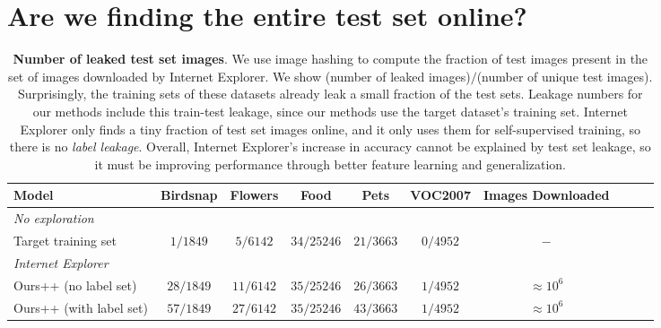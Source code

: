 \section{Are we finding the entire test set online?}
\label{sec:finding_test_set_online}
\begin{table}[t]
    \centering
    \begin{tabular}{lccccccccc}
    \toprule
        Model & Birdsnap & Flowers & Food  & Pets & VOC2007  & Images Downloaded \\
    \midrule
    \textit{No exploration} \\
        \;\;\; Target training set                          &  $1/1849$ &  $5/6142$ & $34/25246$ & $21/3663$ &  $0/4952$ & $-$ \\
    \midrule
    \textit{Internet Explorer} \\
        \;\;\;Ours++ (no label set)                         &  $28/1849$ & $11/6142$ & $35/25246$ & $26/3663$ & $1/4952$ & $\approx 10^6$\\
        \;\;\;Ours++ (with label set)                       & $57/1849$ & $27/6142$ & $35/25246$ & $43/3663$ & $1/4952$ & $\approx 10^6$ \\
    \bottomrule
    \end{tabular}
    \caption{\textbf{Number of leaked test set images}. We use image hashing to compute the fraction of test images present in the set of images downloaded by Internet Explorer.  We show (number of leaked images)$/$(number of unique test images). Surprisingly, the training sets of these datasets already leak a small fraction of the test sets. Leakage numbers for our methods include this train-test leakage, since our methods use the target dataset's training set. Internet Explorer only finds a tiny fraction of test set images online, and it only uses them for self-supervised training, so there is no \textit{label leakage}. Overall, Internet Explorer's increase in accuracy cannot be explained by test set leakage, so it must be improving performance through better feature learning and generalization.
    }
    \label{tab:leakage}
\end{table}
